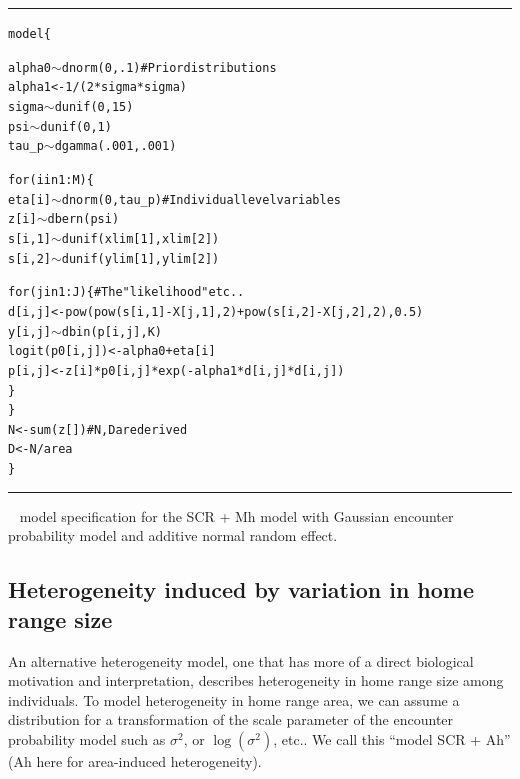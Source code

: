 \begin{panel}[htp]
\centering
\rule[0.1in]{\textwidth}{.03in}
{\small
\begin{alltt}
model\{

alpha0 \(\sim\) dnorm(0,.1)                       # Prior distributions
alpha1 <- 1/(2*sigma*sigma)
sigma \(\sim\) dunif(0, 15)
psi \(\sim\) dunif(0,1)
tau_p \(\sim\) dgamma(.001,.001)

for(i in 1:M)\{
  eta[i] \(\sim\) dnorm(0, tau_p)                 # Individual level variables
    z[i] \(\sim\) dbern(psi)
  s[i,1] \(\sim\) dunif(xlim[1],xlim[2])
  s[i,2] \(\sim\) dunif(ylim[1],ylim[2])

   for(j in 1:J)\{                          # The "likelihood" etc..
   d[i,j] <- pow(pow(s[i,1]-X[j,1],2) + pow(s[i,2]-X[j,2],2),0.5)
   y[i,j] \(\sim\) dbin(p[i,j],K)
   logit(p0[i,j]) <- alpha0 + eta[i]
   p[i,j] <- z[i]*p0[i,j]*exp(- alpha1*d[i,j]*d[i,j])
  \}
 \}
N <- sum(z[])                                # N, D are derived
D <- N/area
\}
\end{alltt}
}

\rule[-0.1in]{\textwidth}{.03in}
\caption{
\jags~ model specification for the SCR + Mh model with Gaussian
encounter 
probability model and additive normal random effect.
}
\label{covariates.panel.SCRMhjags}
\end{panel}




\subsection{Heterogeneity induced by variation in home range size} 
\label{covariates.sec.heterogeneityHR}

An alternative heterogeneity model, one that has more of a direct
biological motivation and interpretation, describes heterogeneity in
home range size among individuals.
To model heterogeneity in home range
area, we can  assume a distribution for
a transformation of the scale
parameter of the encounter  probability model such as $\sigma^{2}$, or
$\log(\sigma^2)$, etc..
We call this 
``model SCR + Ah'' (Ah here for area-induced heterogeneity).

